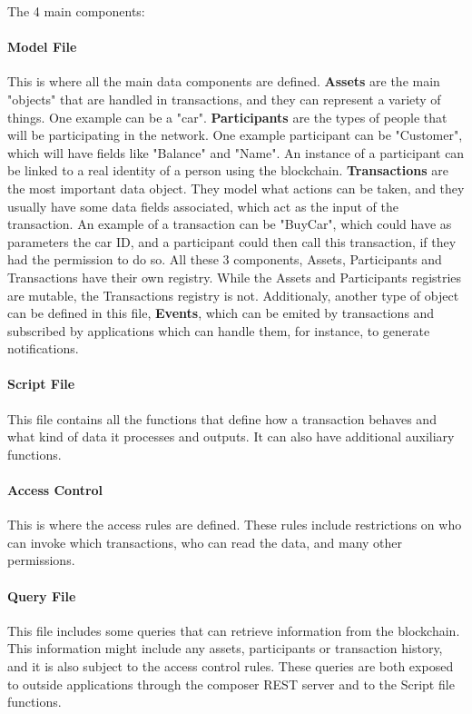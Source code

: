 The 4 main components: 

\paragraph{Model File} This is where all the main data components are defined. \textbf{Assets} are the main "objects" that are handled in transactions, and they can represent a variety of things. One example can be a "car". \textbf{Participants} are the types of people that will be participating in the network. One example participant can be "Customer", which will have fields like "Balance" and "Name". An instance of a participant can be linked to a real identity of a person using the blockchain. \textbf{Transactions} are the most important data object. They model what actions can be taken, and they usually have some data fields associated, which act as the input of the transaction. An example of a transaction can be "BuyCar", which could have as parameters the car ID, and a participant could then call this transaction, if they had the permission to do so. All these 3 components, Assets, Participants and Transactions have their own registry. While the Assets and Participants registries are mutable, the Transactions registry is not. Additionaly, another type of object can be defined in this file, \textbf{Events}, which can be emited by transactions and subscribed by applications which can handle them, for instance, to generate notifications.

\paragraph{Script File} This file contains all the functions that define how a transaction behaves and what kind of data it processes and outputs. It can also have additional auxiliary functions.

\paragraph{Access Control} This is where the access rules are defined. These rules include restrictions on who can invoke which transactions, who can read the data, and many other permissions.

\paragraph{Query File} This file includes some queries that can retrieve information from the blockchain. This information might include any assets, participants or transaction history, and it is also subject to the access control rules. These queries are both exposed to outside applications through the composer REST server and to the Script file functions.

